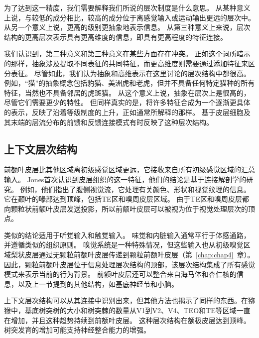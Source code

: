 为了达到这一精度，我们需要解释我们所说的层次制度是什么意思。
从某种意义上说，与较低的成分相比，较高的成分位于离感觉输入或运动输出更远的层次中。
从另一个意义上说，更高的级别更抽象地表示信息。
从第三种意义上来说，层次结构的更高层次表示具有更高维度的信息，即具有更高程度的特征连接。
\par


我们认识到，第二种意义和第三种意义在某些方面存在冲突。
正如这个词所暗示的那样，抽象涉及提取不同表征的共同特征，而更高维度则需要通过添加特征来区分表征。
尽管如此，我们认为抽象和高维表示在这里讨论的层次结构中都很高。
例如，“猫”的抽象概念包括豹猫、美洲虎和老虎，但并不具备任何特定猫种的所有特征，当然也不具备邻居的虎斑猫。
从这个意义上说，抽象在层次上是很高的，尽管它们需要更少的特性。
但同样真实的是，将许多特征合成为一个逐渐更具体的表示，反映了沿着等级制度的上升，正如通常所解释的那样。
基于皮层细胞及其末端的层流分布的前馈和反馈连接模式有时反映了这种层次结构\cite{rockland2000feedback}。



\subsection{上下文层次结构}
\par
前额叶皮层比其他区域离初级感觉区域更远，它接收来自所有初级感觉区域的汇总输入。
Jones首次认识到皮层组织的这一特征，他们的结论是基于连接解剖学的研究\cite{jones1970anatomical}。
例如，他们指出了腹侧视觉流，它处理有关颜色、形状和视觉纹理的信息。
它在颞叶的喙部达到顶峰，包括TE区和嗅周皮层区域。
由于TE区\cite{webster1994connections}和嗅周皮层\cite{petrides2002association}都向颗粒状前额叶皮层发送投影，所以前额叶皮层可以被视为位于视觉处理层次的顶点\cite{young1992objective}。
\par


类似的结论适用于听觉输入\cite{romanski2009primate}和触觉输入\cite{jones1970anatomical}。
味觉和内脏输入通常平行于体感通路，并遵循类似的组织原则。
嗅觉系统是一种特殊情况，但这些输入也从初级嗅觉区域梨状皮层通过无颗粒前额叶皮层传递到颗粒前额叶皮层（第~\ref{chap:chap4}~章）。
因此，颗粒前额叶皮层位于信息处理层次结构的顶部，该层次结构集成了所有感觉模式来表示当前的行为背景。
前额叶皮层还可以整合来自海马体和杏仁核的信息，以及上一节提到的其他结构，如基底神经节和小脑。
\par


上下文层次结构可以从其连接中识别出来，但其他方法也揭示了同样的东西。在猕猴中，基底树突树的大小和树突棘的数量从V1到V2、V4、TEO和TE等区域一直在增加，并且这种趋势持续到前额叶皮层\cite{elston2007specialization}。
这种层次结构在额极皮层达到顶峰。
树突发育的增加可能支持神经整合能力的增强。
\par


